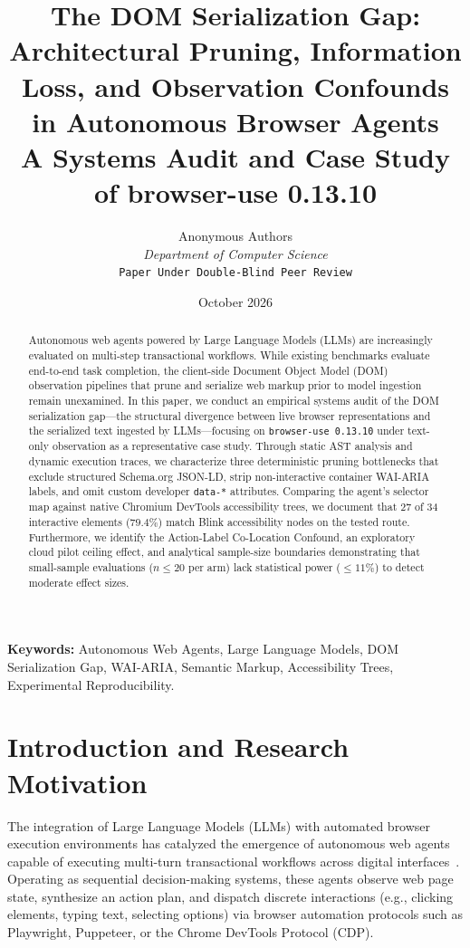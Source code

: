 \documentclass[11pt,a4paper]{article}
\title{\textbf{The DOM Serialization Gap: Architectural Pruning, Information Loss, and Observation Confounds in Autonomous Browser Agents} \\[6pt]
{\large A Systems Audit and Case Study of browser-use 0.13.10}}
\author{
  Anonymous Authors \\
  \textit{Department of Computer Science} \\
  \texttt{Paper Under Double-Blind Peer Review}
}
\date{October 2026}
\begin{document}
\maketitle

\begin{abstract}
Autonomous web agents powered by Large Language Models (LLMs) are increasingly evaluated on multi-step transactional workflows. While existing benchmarks evaluate end-to-end task completion, the client-side Document Object Model (DOM) observation pipelines that prune and serialize web markup prior to model ingestion remain unexamined. In this paper, we conduct an empirical systems audit of the DOM serialization gap---the structural divergence between live browser representations and the serialized text ingested by LLMs---focusing on \texttt{browser-use 0.13.10} under text-only observation as a representative case study. Through static AST analysis and dynamic execution traces, we characterize three deterministic pruning bottlenecks that exclude structured Schema.org JSON-LD, strip non-interactive container WAI-ARIA labels, and omit custom developer \texttt{data-*} attributes. Comparing the agent's selector map against native Chromium DevTools accessibility trees, we document that 27 of 34 interactive elements ($79.4\%$) match Blink accessibility nodes on the tested route. Furthermore, we identify the Action-Label Co-Location Confound, an exploratory cloud pilot ceiling effect, and analytical sample-size boundaries demonstrating that small-sample evaluations ($n \le 20$ per arm) lack statistical power ($\le 11\%$) to detect moderate effect sizes.
\end{abstract}

\textbf{Keywords:} Autonomous Web Agents, Large Language Models, DOM Serialization Gap, WAI-ARIA, Semantic Markup, Accessibility Trees, Experimental Reproducibility.

\section{Introduction and Research Motivation}
\label{sec:intro}

The integration of Large Language Models (LLMs) with automated browser execution environments has catalyzed the emergence of autonomous web agents capable of executing multi-turn transactional workflows across digital interfaces~\cite{zhou2024webarena, deng2023mind2web, drouin2024workarena, workarenapp2024, osworld2024}. Operating as sequential decision-making systems, these agents observe web page state, synthesize an action plan, and dispatch discrete interactions (e.g., clicking elements, typing text, selecting options) via browser automation protocols such as Playwright, Puppeteer, or the Chrome DevTools Protocol (CDP).
\end{document}
